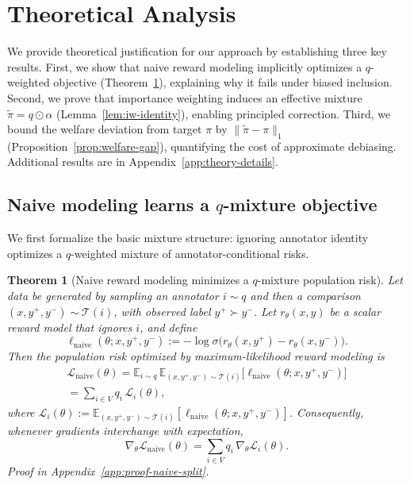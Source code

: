 \documentclass{article}
\theoremstyle{plain}
\newtheorem{theorem}{Theorem}[section]
\theoremstyle{definition}
\theoremstyle{remark}
\begin{document}
\section{Theoretical Analysis}
\label{sec:theory}

We provide theoretical justification for our approach by establishing three key results. First, we show that naive reward modeling implicitly optimizes a $q$-weighted objective (Theorem~\ref{thm:naive-q-objective}), explaining why it fails under biased inclusion. Second, we prove that importance weighting induces an effective mixture $\tilde\pi=q\odot\alpha$ (Lemma~\ref{lem:iw-identity}), enabling principled correction. Third, we bound the welfare deviation from target $\pi$ by $\|\tilde\pi-\pi\|_1$ (Proposition~\ref{prop:welfare-gap}), quantifying the cost of approximate debiasing. Additional results are in Appendix~\ref{app:theory-details}.

\subsection{Naive modeling learns a $q$-mixture objective}
\label{subsec:naive-mixture}

We first formalize the basic mixture structure: ignoring annotator identity
optimizes a $q$-weighted mixture of annotator-conditional risks.

\begin{theorem}[Naive reward modeling minimizes a $q$-mixture population risk]
\label{thm:naive-q-objective}
Let data be generated by sampling an annotator $i \sim q$ and then a comparison
$(x,y^+,y^-)\sim \mathcal{T}(i)$, with observed label $y^+ \succ y^-$.
Let $r_\theta(x,y)$ be a scalar reward model that ignores $i$, and define
\[
\ell_{\mathrm{naive}}(\theta;x,y^+,y^-)
:=
-\log\sigma\!\big(r_\theta(x,y^+)-r_\theta(x,y^-)\big).
\]
Then the population risk optimized by maximum-likelihood reward modeling is
\begin{equation}
\begin{aligned}
\mathcal{L}_{\text{naive}}(\theta)
=
\mathbb{E}_{i\sim q}\,
\mathbb{E}_{(x,y^+,y^-)\sim\mathcal{T}(i)}
\big[\ell_{\mathrm{naive}}(\theta;x,y^+,y^-)\big] \\
=
\sum_{i\in V} q_i\,\mathcal{L}_i(\theta), \qquad\qquad\qquad\qquad\qquad\qquad
\label{eq:naive-q-mixture-risk}
\end{aligned}
\end{equation}
where $\mathcal{L}_i(\theta):=
\mathbb{E}_{(x,y^+,y^-)\sim\mathcal{T}(i)}[\ell_{\mathrm{naive}}(\theta;x,y^+,y^-)]$.
Consequently, whenever gradients interchange with expectation,
\begin{equation}
\nabla_\theta \mathcal{L}_{\text{naive}}(\theta)
=
\sum_{i\in V} q_i\,\nabla_\theta \mathcal{L}_i(\theta).
\label{eq:naive-q-mixture-grad}
\end{equation}
Proof in Appendix~\ref{app:proof-naive-split}.
\end{theorem}
\end{document}
